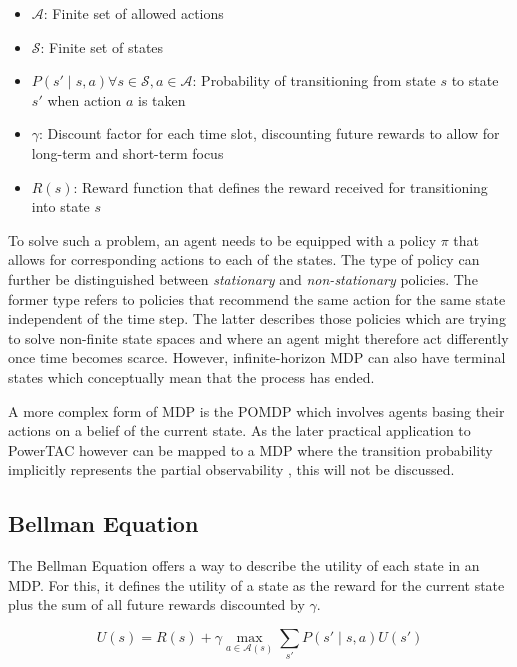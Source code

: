 \begin{itemize}
    \item $\mathcal{A}$: Finite set of allowed actions
    \item $\mathcal{S}$: Finite set of states
    \item $P(s' \mid s,a) \forall s \in \mathcal{S}, a \in \mathcal{A}$: Probability of transitioning from state
        $s$ to state $s'$ when action $a$ is taken
    \item $\gamma$: Discount factor for each time slot, discounting future rewards to allow for long-term and
        short-term focus
    \item $R(s)$: Reward function that defines the reward received for transitioning into state $s$
\end{itemize}

To solve such a problem, an agent needs to be equipped with a policy $\pi$ that allows for corresponding actions to each
of the states. The type of policy can further be distinguished between \emph{stationary} and \emph{non-stationary}
policies. The former type refers to policies that recommend the same action for the same state independent of the
time step. The latter describes those policies which are trying to solve non-finite state spaces and where an
agent might therefore act differently once time becomes scarce. However, infinite-horizon \ac{MDP} can also have
terminal states which conceptually mean that the process has ended.

A more complex form of \ac{MDP} is the \ac{POMDP} which involves agents basing their actions on a belief of the
current state. As the later practical application to \ac{PowerTAC}  however can be mapped to a \ac{MDP}
where the transition probability implicitly represents the partial observability \citep{tactexurieli2016mdp}, this will not be discussed.

\subsection{Bellman Equation}%
\label{ssub:bellman_equation}

The Bellman Equation offers a way to describe the utility of each state in an \ac{MDP}. For this, it defines the
utility of a state as the reward for the current state plus the sum of all future rewards discounted by $\gamma$.

\begin{equation}
    U(s) = R(s) + \gamma \max_{a\in\mathcal{A}(s)} \sum_{s'}{P(s' \mid s,a)U(s')}
\end{equation}

